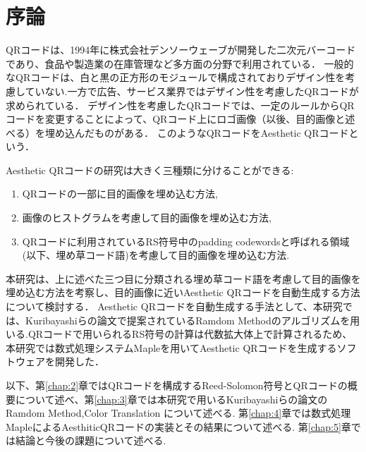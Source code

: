 \documentclass{thesis}
\begin{document}
\tableofcontents

\chapter{序論}

QRコード\cite{QR}は、1994年に株式会社デンソーウェーブが開発した二次元バーコード であり、食品や製造業の在庫管理など多方面の分野で利用されている．
一般的なQRコードは、白と黒の正方形のモジュールで構成されておりデザイン性を考慮していない.一方で広告、サービス業界ではデザイン性を考慮したQRコードが求められている．
デザイン性を考慮したQRコードでは、一定のルールからQRコードを変更することによって、QRコード上にロゴ画像（以後、目的画像と述べる）を埋め込んだものがある．
このようなQRコードをAesthetic QRコード\cite{KURI}という．

Aesthetic QRコードの研究は大きく三種類に分けることができる:

\begin{enumerate}
\item
QRコードの一部に目的画像を埋め込む方法,
\item
画像のヒストグラムを考慮して目的画像を埋め込む方法\cite{hist},
\item
QRコードに利用されているRS符号中のpadding codewordsと呼ばれる領域(以下、埋め草コード語)を考慮して目的画像を埋め込む方法\cite{KURI}.
\end{enumerate}

本研究は、上に述べた三つ目に分類される埋め草コード語を考慮して目的画像を埋め込む方法を考察し、目的画像に近いAesthetic QRコードを自動生成する方法について検討する．
Aesthetic QRコードを自動生成する手法として、本研究では、Kuribayashiらの論文\cite{KURI}で提案されているRamdom Methodのアルゴリズムを用いる.QRコードで用いられるRS符号の計算は代数拡大体上で計算されるため、本研究では数式処理システムMapleを用いてAesthetic QRコードを生成するソフトウェアを開発した．

以下、第\ref{chap:2}章ではQRコードを構成するReed-Solomon符号とQRコードの概要について述べ、第\ref{chap:3}章では本研究で用いるKuribayashiらの論文\cite{KURI}のRamdom Method,Color Translation
について述べる.
第\ref{chap:4}章では数式処理MapleによるAesthiticQRコードの実装とその結果について述べる.
第\ref{chap:5}章では結論と今後の課題について述べる.
\end{document}
